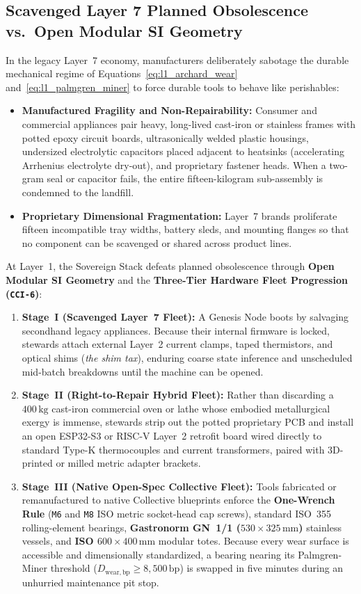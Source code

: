 \subsection{Scavenged Layer 7 Planned Obsolescence vs.\ Open Modular SI Geometry}

In the legacy Layer~7 economy, manufacturers deliberately sabotage the durable mechanical regime of Equations~\eqref{eq:l1_archard_wear} and~\eqref{eq:l1_palmgren_miner} to force durable tools to behave like perishables:
\begin{itemize}
    \item \textbf{Manufactured Fragility and Non-Repairability:} Consumer and commercial appliances pair heavy, long-lived cast-iron or stainless frames with potted epoxy circuit boards, ultrasonically welded plastic housings, undersized electrolytic capacitors placed adjacent to heatsinks (accelerating Arrhenius electrolyte dry-out), and proprietary fastener heads. When a two-gram seal or capacitor fails, the entire fifteen-kilogram sub-assembly is condemned to the landfill.
    \item \textbf{Proprietary Dimensional Fragmentation:} Layer~7 brands proliferate fifteen incompatible tray widths, battery sleds, and mounting flanges so that no component can be scavenged or shared across product lines.
\end{itemize}

At Layer~1, the Sovereign Stack defeats planned obsolescence through \textbf{Open Modular SI Geometry} and the \textbf{Three-Tier Hardware Fleet Progression (\texttt{CCI-6})}:
\begin{enumerate}
    \item \textbf{Stage~I (Scavenged Layer~7 Fleet):} A Genesis Node boots by salvaging secondhand legacy appliances. Because their internal firmware is locked, stewards attach external Layer~2 current clamps, taped thermistors, and optical shims (\textit{the shim tax}), enduring coarse state inference and unscheduled mid-batch breakdowns until the machine can be opened.
    \item \textbf{Stage~II (Right-to-Repair Hybrid Fleet):} Rather than discarding a $400\,\mathrm{kg}$ cast-iron commercial oven or lathe whose embodied metallurgical exergy is immense, stewards strip out the potted proprietary PCB and install an open ESP32-S3 or RISC-V Layer~2 retrofit board wired directly to standard Type-K thermocouples and current transformers, paired with 3D-printed or milled metric adapter brackets.
    \item \textbf{Stage~III (Native Open-Spec Collective Fleet):} Tools fabricated or remanufactured to native Collective blueprints enforce the \textbf{One-Wrench Rule} (\texttt{M6} and \texttt{M8} ISO metric socket-head cap screws), standard ISO~355 rolling-element bearings, \textbf{Gastronorm GN~1/1 ($530 \times 325\,\mathrm{mm}$)} stainless vessels, and \textbf{ISO $600 \times 400\,\mathrm{mm}$} modular totes. Because every wear surface is accessible and dimensionally standardized, a bearing nearing its Palmgren-Miner threshold ($D_{\mathrm{wear,bp}} \ge 8{,}500\,\mathrm{bp}$) is swapped in five minutes during an unhurried maintenance pit stop.
\end{enumerate}

